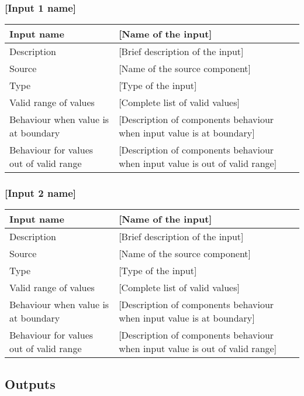 \subsubsection{[Input 1 name]}

\begin{longtable}{p{}p{}}
\toprule
Input name				& [Name of the input] \\
\midrule
Description				& [Brief description of the input] \\
\midrule
Source					& [Name of the source component] \\ 
\midrule
Type						& [Type of the input] \\
\midrule
Valid range of values	& [Complete list of valid values] \\
\midrule
Behaviour when value is at boundary	& [Description of components behaviour when input value is at boundary] \\
\midrule
Behaviour for values out of valid range	& [Description of components behaviour when input value is out of valid range] \\
\bottomrule
\end{longtable}


\subsubsection{[Input 2 name]}

\begin{longtable}{p{}p{}}
\toprule
Input name				& [Name of the input] \\
\midrule
Description				& [Brief description of the input] \\
\midrule
Source					& [Name of the source component] \\ 
\midrule
Type						& [Type of the input] \\
\midrule
Valid range of values	& [Complete list of valid values] \\
\midrule
Behaviour when value is at boundary	& [Description of components behaviour when input value is at boundary] \\
\midrule
Behaviour for values out of valid range	& [Description of components behaviour when input value is out of valid range] \\
\bottomrule
\end{longtable}


\subsection{Outputs}\label{s:template_outputs}


